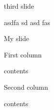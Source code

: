 \begin{frame}{third slide}
\protect\hypertarget{third-slide}{}

asdfa sd asd fas

\end{frame}

\begin{frame}{My slide}
\protect\hypertarget{my-slide}{}

\begin{block}{First column}

contents

\end{block}

\begin{block}{Second column}

contents

\end{block}

\end{frame}
